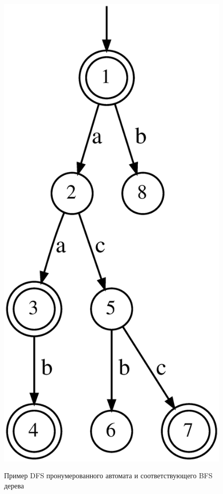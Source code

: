 \begin{figure}[ht]
{    \includegraphics[scale=0.15]{img/datamod/DFS-tree.eps}
  }
  \caption{Пример DFS пронумерованного автомата и соответствующего BFS дерева}
  \label{syn:img:dfs}
\end{figure}


